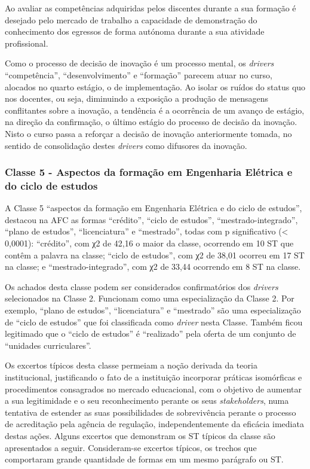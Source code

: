 \documentclass{textolivre-html}
\begin{document}
Ao avaliar as competências adquiridas pelos discentes durante a sua formação é desejado pelo mercado de trabalho a capacidade de demonstração do conhecimento dos egressos de forma autónoma durante a sua atividade profissional.

Como o processo de decisão de inovação é um processo mental, os \textit{drivers} “competência”, “desenvolvimento” e “formação” parecem atuar no curso, alocados no quarto estágio, o de implementação. Ao isolar os ruídos do status quo nos docentes, ou seja, diminuindo a exposição a produção de mensagens conflitantes sobre a inovação, a tendência é a ocorrência de um avanço de estágio, na direção da confirmação, o último estágio do processo de decisão da inovação. Nisto o curso passa a reforçar a decisão de inovação anteriormente tomada, no sentido de consolidação destes \textit{drivers} como difusores da inovação.

\subsubsection{Classe 5 - Aspectos da formação em Engenharia Elétrica e do ciclo de estudos}\label{sec-aspectos}
A Classe 5 “aspectos da formação em Engenharia Elétrica e do ciclo de estudos”, destacou na AFC as formas “crédito”, “ciclo de estudos”, “mestrado-integrado”, “plano de estudos”, “licenciatura” e “mestrado”, todas com p significativo (< 0,0001): “crédito”, com χ2 de 42,16 o maior da classe, ocorrendo em 10 ST que contêm a palavra na classe; “ciclo de estudos”, com χ2 de 38,01 ocorreu em 17 ST na classe; e “mestrado-integrado”, com χ2 de 33,44 ocorrendo em 8 ST na classe.

Os achados desta classe podem ser considerados confirmatórios dos \textit{drivers} selecionados na Classe 2. Funcionam como uma especialização da Classe 2. Por exemplo, “plano de estudos”, “licenciatura” e “mestrado” são uma especialização de “ciclo de estudos” que foi classificada como \textit{driver} nesta Classe. Também ficou legitimado que o “ciclo de estudos” é “realizado” pela oferta de um conjunto de “unidades curriculares”.

Os excertos típicos desta classe permeiam a noção derivada da teoria institucional, justificando o fato de a instituição incorporar práticas isomórficas e procedimentos consagrados no mercado educacional, com o objetivo de aumentar a sua legitimidade e o seu reconhecimento perante os seus \textit{stakeholders}, numa tentativa de estender as suas possibilidades de sobrevivência perante o processo de acreditação pela agência de regulação, independentemente da eficácia imediata destas ações. Alguns excertos que demonstram os ST típicos da classe são apresentados a seguir. Consideram-se excertos típicos, os trechos que comportaram grande quantidade de formas em um mesmo parágrafo ou ST.
\end{document}
